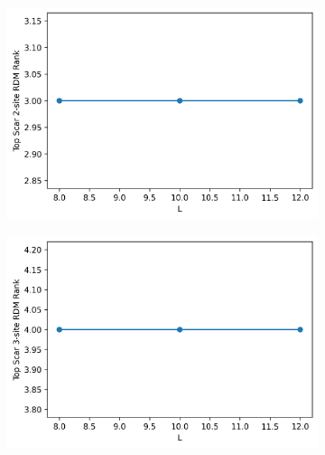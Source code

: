 \documentclass[11pt]{article}
\begin{document}
\begin{itemize}
\begin{itemize}
    
    \begin{figure}[H]
    \centering
    \begin{subfigure}{0.45\textwidth}
        \includegraphics[width=\linewidth]{hb_scar_2e.png}
        \caption{}
        \label{fig:image1h}
    \end{subfigure}
    \begin{subfigure}{0.45\textwidth}
        \includegraphics[width=\linewidth]{hb_scar_3e.png}
        \caption{}
        \label{fig:image2hb}
    \end{subfigure}    %
    \begin{subfigure}{0.45\textwidth}

\end{subfigure}
\end{figure}
\end{itemize}
\end{itemize}
\end{document}
